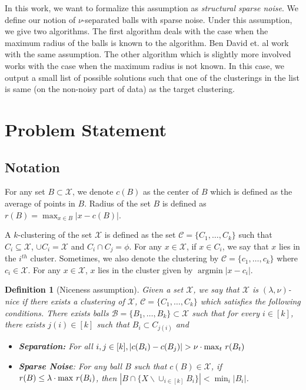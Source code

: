 \documentclass[twoside]{article}
\newcommand{\mc}{\mathcal}
\newtheorem{definition}[theorem]{Definition}
\DeclareMathOperator{\argmin}{argmin}
\begin{document}
In this work, we want to formalize this assumption as \emph{structural sparse noise}. We define our notion of $\nu$-separated balls with sparse noise. Under this assumption, we give two algorithms. The first algorithm deals with the case when the maximum radius of the balls is known to the algorithm. Ben David et. al \cite{ben2014clustering} work with the same assumption. The other algorithm which is slightly more involved works with the case when the maximum radius is not known. In this case, we output a small list of possible solutions such that one of the clusterings in the list is same (on the non-noisy part of data) as the target clustering. 


\section{Problem Statement}

\subsection{Notation}
For any set $B\subset \mc X$, we denote $c(B)$ as the center of $B$ which is defined as the average of points in $B$. Radius of the set $B$ is defined as $r(B)=\max_{x\in B} |x-c(B)|$. 

A $k$-clustering of the set $\mc X$ is defined as the set $\mc C = \{C_1,\ldots,C_k\}$ such that $C_i \subseteq \mc X$, $\cup C_i = \mc X$ and $C_i \cap C_j = \phi$. For any $x \in \mc X$, if $x \in C_i$, we say that $x$ lies in the $i^{th}$ cluster. Sometimes, we also denote the clustering by $\mc C = \{c_1,\ldots,c_k\}$ where $c_i \in \mc X$. For any $x \in \mc X$, $x$ lies in the cluster given by $\argmin |x-c_i|$.

\begin{definition}[Niceness assumption]
Given a set $\mc X$, we say that $\mc X$ is $(\lambda,\nu)$-nice if there exists a clustering of $\mc X$, $\mc C=\{C_1,\ldots,C_k\}$ which satisfies the following conditions. There exists balls $\mc B=\{B_1,\ldots,B_k\}\subset \mathcal{X}$ such that for every $i\in[k]$, there exists $j(i)\in[k]$ such that $B_i\subset C_{j(i)}$ and
\begin{itemize}
\item{\bf{Separation}:} For all $i,j\in[k], |c(B_i)-c(B_j)| > \nu\cdot\max_t \thinspace r(B_t)$
\item{\bf{Sparse Noise}}: For any ball $B$ such that $c(B)\in \mathcal{X}$, if $r(B)\leq \lambda \cdot \max \thinspace r(B_i)$, then $|B\cap \{X \backslash \cup_{i\in[k]} B_i\}| < \min_i |B_i|$.
\end{itemize}
\label{defn:niceness}
\end{definition}
\end{document}
